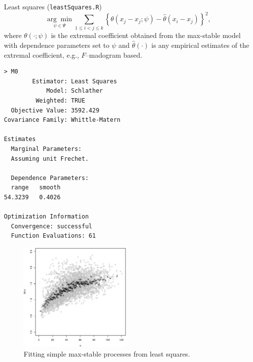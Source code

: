 \documentclass[blackslide,style=simple]{powerdot}
\theoremstyle{plain}%
\theoremstyle{definition}
\theoremstyle{remark}
\begin{document}
\begin{wideslide}[toc=Least squares,method=file]{Least squares (\texttt{leastSquares.R})}
  \vspace*{-0.5em}
  \begin{equation*}
    \underset{\psi \in \Psi}{\arg \min} \sum_{1 \leq i < j \leq k}
    \left\{\theta(x_j - x_j; \psi) - \hat \theta(x_i - x_j)
    \right\}^2,
  \end{equation*}
  where $\theta(\cdot; \psi)$ is the extremal coefficient obtained
  from the max-stable model with dependence parameters set to $\psi$
  and $\hat \theta(\cdot)$ is any empirical estimates of the extremal
  coefficient, e.g., $F$--madogram based.

  \begin{minipage}[l]{.33\linewidth}
{\tiny
\begin{verbatim}
> M0
        Estimator: Least Squares 
            Model: Schlather 
         Weighted: TRUE 
  Objective Value: 3592.429 
Covariance Family: Whittle-Matern 

Estimates
  Marginal Parameters:
  Assuming unit Frechet.

  Dependence Parameters:
  range   smooth  
54.3239   0.4026  

Optimization Information
  Convergence: successful 
  Function Evaluations: 61 
\end{verbatim}
}
  \end{minipage}
  \hfill
  \begin{minipage}[r]{.6\linewidth}
    \begin{figure}
      \centering
      \includegraphics[width=0.49\textwidth]{Figures/empExtCoeffRain}%
      \caption{Fitting simple max-stable processes from least
        squares.}
      \label{fig:leastSquares}
    \end{figure}
  \end{minipage}
\end{wideslide}
\end{document}
